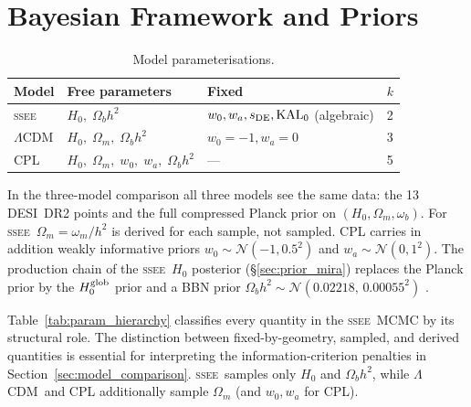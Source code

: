 \documentclass[12pt,a4paper]{article}
\newcommand{\SSEE}{\ifmmode\mathrm{SSEE}\else\textsc{ssee}\fi}
\newcommand{\LCDM}{\ifmmode\Lambda\mathrm{CDM}\else$\Lambda$CDM\fi}
\newcommand{\KALz}{\mathrm{KAL}_0}
\newcommand{\wz}{w_0}
\newcommand{\wa}{w_a}
\begin{document}
\section{Bayesian Framework and Priors}
\label{sec:bayes}

\begin{table}[H]
\centering
\caption{Model parameterisations.}
\label{tab:models}
\begin{tabular}{llll}
\toprule
Model & Free parameters & Fixed & $k$ \\
\midrule
\SSEE & $H_0,\;\Omega_b h^2$ & $\wz,\wa,s_{\rm DE},\KALz$ (algebraic) & 2 \\
\LCDM      & $H_0,\;\Omega_m,\;\Omega_b h^2$ & $\wz=-1,\wa=0$ & 3 \\
CPL        & $H_0,\;\Omega_m,\;\wz,\;\wa,\;\Omega_b h^2$ & --- & 5 \\
\bottomrule
\end{tabular}
\end{table}

In the three-model comparison all three models see the same data: the 13
DESI~DR2 points and the full compressed Planck prior on $(H_0,\Omega_m,\omega_b)$.
For \SSEE\ $\Omega_m=\omega_m/h^2$ is derived for each sample, not sampled. CPL
carries in addition weakly informative priors $\wz\sim\mathcal{N}(-1,0.5^2)$ and
$\wa\sim\mathcal{N}(0,1^2)$. The production chain of the \SSEE\ $H_0$ posterior
(\S\ref{sec:prior_mira}) replaces the Planck prior by the $H_0^{\rm glob}$ prior and a
BBN prior $\Omega_b h^2\sim\mathcal{N}(0.02218,\,0.00055^2)$ \citep{Schoneberg2024}.

Table~\ref{tab:param_hierarchy} classifies every quantity in the \SSEE\
MCMC by its structural role. The distinction between fixed-by-geometry,
sampled, and derived quantities is essential for interpreting the
information-criterion penalties in Section~\ref{sec:model_comparison}.
\SSEE\ samples only $H_0$ and $\Omega_b h^2$, while \LCDM\ and CPL
additionally sample $\Omega_m$ (and $\wz,\wa$ for CPL).
\end{document}
